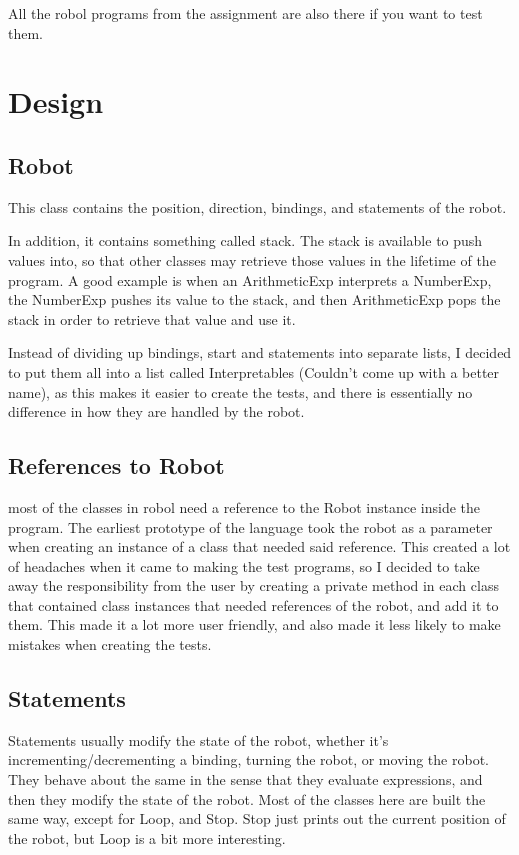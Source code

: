 \documentclass[letterpaper,10pt,english]{sphinxmanual}
\begin{document}
\sphinxAtStartPar
All the robol programs from the assignment are also there if you want to test them.


\chapter{Design}
\label{\detokenize{design:design}}\label{\detokenize{design::doc}}

\section{Robot}
\label{\detokenize{design:robot}}
\sphinxAtStartPar
This class contains the position, direction, bindings, and statements of the robot.

\sphinxAtStartPar
In addition, it contains something called stack. The stack is available to push values into, so that other classes may retrieve those values in the lifetime of the program.
A good example is when an ArithmeticExp interprets a NumberExp, the NumberExp pushes its value to the stack, and then ArithmeticExp pops the stack in order to retrieve that value and use it.

\sphinxAtStartPar
Instead of dividing up bindings, start and statements into separate lists, I decided to put them all into a list called Interpretables (Couldn’t come up with a better name), as this makes it easier to create the tests, and there is essentially no difference in how they are handled by the robot.


\section{References to Robot}
\label{\detokenize{design:references-to-robot}}
\sphinxAtStartPar
most of the classes in robol need a reference to the Robot instance inside the program.
The earliest prototype of the language took the robot as a parameter when creating an instance of a class that needed said reference.
This created a lot of headaches when it came to making the test programs, so I decided to take away the responsibility from the user by creating a private method in each class that contained class instances that needed references of the robot, and add it to them.
This made it a lot more user friendly, and also made it less likely to make mistakes when creating the tests.


\section{Statements}
\label{\detokenize{design:statements}}
\sphinxAtStartPar
Statements usually modify the state of the robot, whether it’s incrementing/decrementing a binding, turning the robot, or moving the robot. They behave about the same in the sense that they evaluate expressions, and then they modify the state of the robot.
Most of the classes here are built the same way, except for Loop, and Stop.
Stop just prints out the current position of the robot, but Loop is a bit more interesting.
\end{document}
